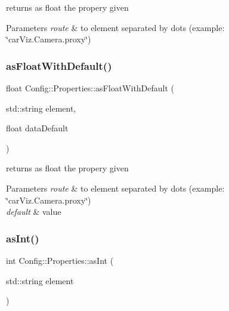 returns as float the propery given 


\begin{DoxyParams}{Parameters}
{\em route} & to element separated by dots (example\+: \char`\"{}car\+Viz.\+Camera.\+proxy\char`\"{}) \\
\hline
\end{DoxyParams}
\mbox{\label{class_config_1_1_properties_a30c642acc0904cf510825bf29034eb95}} 
\subsubsection{\texorpdfstring{as\+Float\+With\+Default()}{asFloatWithDefault()}}
{\footnotesize\ttfamily float Config\+::\+Properties\+::as\+Float\+With\+Default (\begin{DoxyParamCaption}\item[{std\+::string}]{element,  }\item[{float}]{data\+Default }\end{DoxyParamCaption})}



returns as float the propery given 


\begin{DoxyParams}{Parameters}
{\em route} & to element separated by dots (example\+: \char`\"{}car\+Viz.\+Camera.\+proxy\char`\"{}) \\
\hline
{\em default} & value \\
\hline
\end{DoxyParams}
\mbox{\label{class_config_1_1_properties_aa30deb695b2a7ca89332c9db746efc07}} 
\subsubsection{\texorpdfstring{as\+Int()}{asInt()}}
{\footnotesize\ttfamily int Config\+::\+Properties\+::as\+Int (\begin{DoxyParamCaption}\item[{std\+::string}]{element }\end{DoxyParamCaption})}




